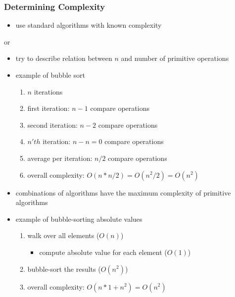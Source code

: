 \begin{frame}
 \frametitle{Determining Complexity}
 \begin{itemize}
  \item use standard algorithms with known complexity
 \end{itemize}

 or

 \begin{itemize}
  \item try to describe relation between \( n \) and number of primitive operations
  \item example of bubble sort
  \begin{enumerate}
   \item \(n\) iterations
   \item first iteration: \( n-1 \) compare operations
   \item second iteration: \( n-2 \) compare operations
   \item \(n'th\) iteration: \( n-n = 0 \) compare operations
   \item average per iteration: \( n/2 \) compare operations
   \item overall complexity: \( O(n * n/2) = O(n^2 / 2) = O(n^2) \)
  \end{enumerate}
  \item combinations of algorithms have the maximum complexity of primitive algorithms
  \item example of bubble-sorting absolute values
  \begin{enumerate}
   \item walk over all elements (\( O(n) \))
   \begin{itemize}
    \item compute absolute value for each element (\( O(1) \))
   \end{itemize}
   \item bubble-sort the results (\( O(n^2) \))
   \item overall complexity: \( O(n*1 + n^2) = O(n^2) \)
  \end{enumerate}
 \end{itemize}
\end{frame}

